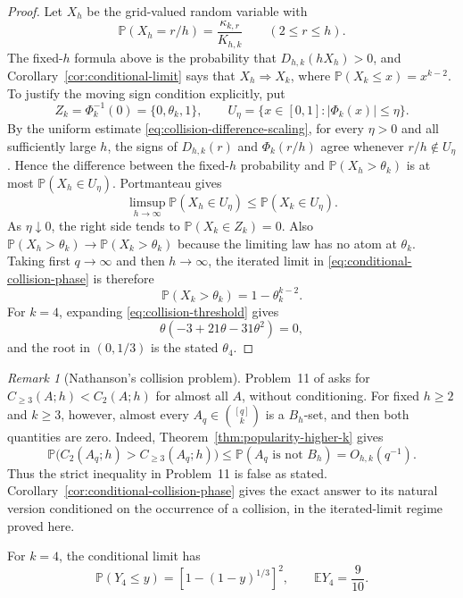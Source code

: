 \documentclass[11pt,reqno]{amsart}
\theoremstyle{definition}
\theoremstyle{remark}
\newtheorem{remark}[theorem]{Remark}
\begin{document}
\begin{proof}
Let $X_h$ be the grid-valued random variable with
\[
 \mathbb P(X_h=r/h)=\frac{\kappa_{k,r}}{K_{h,k}}
 \qquad(2\leq r\leq h).
\]
The fixed-$h$ formula above is the probability that
$D_{h,k}(hX_h)>0$, and Corollary~\ref{cor:conditional-limit} says that
$X_h\Longrightarrow X_k$, where
$\mathbb P(X_k\leq x)=x^{k-2}$.  To justify the moving sign condition
explicitly, put
\[
 Z_k=\Phi_k^{-1}(0)=\{0,\theta_k,1\},
 \qquad U_\eta=\{x\in[0,1]:|\Phi_k(x)|\leq\eta\}.
\]
By the uniform estimate \eqref{eq:collision-difference-scaling}, for every
$\eta>0$ and all sufficiently large $h$, the signs of $D_{h,k}(r)$ and
$\Phi_k(r/h)$ agree whenever $r/h\notin U_\eta$.  Hence the difference
between the fixed-$h$ probability and $\mathbb P(X_h>\theta_k)$ is at most
$\mathbb P(X_h\in U_\eta)$.  Portmanteau gives
\[
 \limsup_{h\to\infty}\mathbb P(X_h\in U_\eta)
 \leq\mathbb P(X_k\in U_\eta).
\]
As $\eta\downarrow0$, the right side tends to
$\mathbb P(X_k\in Z_k)=0$.  Also
$\mathbb P(X_h>\theta_k)\to\mathbb P(X_k>\theta_k)$ because the limiting
law has no atom at $\theta_k$.  Taking first $q\to\infty$ and then
$h\to\infty$, the iterated limit in
\eqref{eq:conditional-collision-phase} is therefore
\[
 \mathbb P(X_k>\theta_k)
 =1-\theta_k^{k-2}.
\]
\enlargethispage{\baselineskip}
For $k=4$, expanding \eqref{eq:collision-threshold} gives
\[
 \theta(-3+21\theta-31\theta^2)=0,
\]
and the root in $(0,1/3)$ is the stated $\theta_4$.
\end{proof}

\begin{remark}[Nathanson's collision problem]
\label{rem:nathanson-problem11}
Problem~11 of \cite{NathansonTriangular} asks for
$C_{\geq3}(A;h)<C_2(A;h)$ for almost all $A$, without conditioning.
For fixed $h\geq2$ and $k\geq3$, however, almost every
$A_q\in\binom{[q]}k$ is a
$B_h$-set, and then both quantities are zero.  Indeed,
Theorem~\ref{thm:popularity-higher-k} gives
\[
 \mathbb P\bigl(C_2(A_q;h)>C_{\geq3}(A_q;h)\bigr)
 \leq
 \mathbb P(A_q\text{ is not }B_h)
 =O_{h,k}(q^{-1}).
\]
Thus the strict inequality in Problem~11 is false as stated.
Corollary~\ref{cor:conditional-collision-phase} gives the exact answer to its
natural version conditioned on the occurrence of a collision, in the
iterated-limit regime proved here.
\end{remark}

For $k=4$, the conditional limit has
\[
 \mathbb P(Y_4\leq y)=\left[1-(1-y)^{1/3}\right]^2,
 \qquad \mathbb E Y_4=\frac9{10}.
\]
\end{document}
